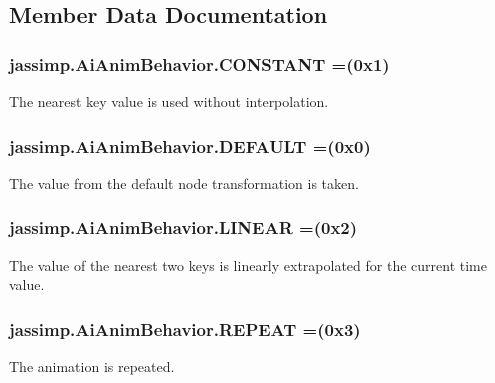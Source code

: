 \subsection{Member Data Documentation}
\hypertarget{enumjassimp_1_1_ai_anim_behavior_a0bf7bab418fc45aa393744cf92a8a2c1}{
\subsubsection[{C\+O\+N\+S\+T\+A\+N\+T}]{\setlength{\rightskip}{0pt plus 5cm}jassimp.\+Ai\+Anim\+Behavior.\+C\+O\+N\+S\+T\+A\+N\+T =(0x1)}}\label{enumjassimp_1_1_ai_anim_behavior_a0bf7bab418fc45aa393744cf92a8a2c1}
The nearest key value is used without interpolation. \hypertarget{enumjassimp_1_1_ai_anim_behavior_ab12c1ddd4d41cbae806540c02f71943b}{
\subsubsection[{D\+E\+F\+A\+U\+L\+T}]{\setlength{\rightskip}{0pt plus 5cm}jassimp.\+Ai\+Anim\+Behavior.\+D\+E\+F\+A\+U\+L\+T =(0x0)}}\label{enumjassimp_1_1_ai_anim_behavior_ab12c1ddd4d41cbae806540c02f71943b}
The value from the default node transformation is taken. \hypertarget{enumjassimp_1_1_ai_anim_behavior_a01192c9e7ec585ba829450a7be9bdd2f}{
\subsubsection[{L\+I\+N\+E\+A\+R}]{\setlength{\rightskip}{0pt plus 5cm}jassimp.\+Ai\+Anim\+Behavior.\+L\+I\+N\+E\+A\+R =(0x2)}}\label{enumjassimp_1_1_ai_anim_behavior_a01192c9e7ec585ba829450a7be9bdd2f}
The value of the nearest two keys is linearly extrapolated for the current time value. \hypertarget{enumjassimp_1_1_ai_anim_behavior_a6b93f88c0311f026dce06e0743ef2fd0}{
\subsubsection[{R\+E\+P\+E\+A\+T}]{\setlength{\rightskip}{0pt plus 5cm}jassimp.\+Ai\+Anim\+Behavior.\+R\+E\+P\+E\+A\+T =(0x3)}}\label{enumjassimp_1_1_ai_anim_behavior_a6b93f88c0311f026dce06e0743ef2fd0}
The animation is repeated.

